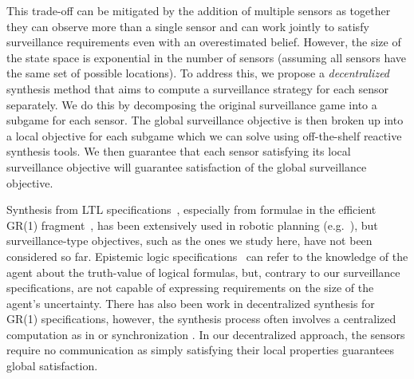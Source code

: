This trade-off can be mitigated by the addition of multiple sensors as together they can observe more than a single sensor and can work jointly to satisfy surveillance requirements even with an overestimated belief. However, the size of the state space is exponential in the number of sensors (assuming all sensors have the same set of possible locations). To address this, we propose a \emph{decentralized} synthesis method that aims to compute a surveillance strategy for each sensor separately. We do this by decomposing the original surveillance game into a subgame for each sensor. The global surveillance objective is then broken up into a local objective for each subgame which we can solve using off-the-shelf reactive synthesis tools. We then guarantee
that each sensor satisfying its local surveillance objective will guarantee satisfaction of the global surveillance objective.

Synthesis from LTL specifications~\cite{Pnueli1989}, especially from formulae in the efficient GR(1) fragment~\cite{Piterman2006}, has been extensively used in robotic planning (e.g.~\cite{wong2012,Kress2007}), but surveillance-type objectives, such as the ones we study here, have not been considered so far. Epistemic logic specifications~\cite{MeydenV98} can refer to the knowledge of the agent about the truth-value of logical formulas, but, contrary to our surveillance specifications, are not capable of expressing requirements on the size of the agent's uncertainty. There has also been work in decentralized synthesis for GR(1) specifications, however, the synthesis process often involves a centralized computation as in \cite{Kloetzer06} or synchronization \cite{Salar17,Kloetzer11}. In our decentralized approach, the sensors require no communication as simply satisfying their local properties guarantees global satisfaction.



